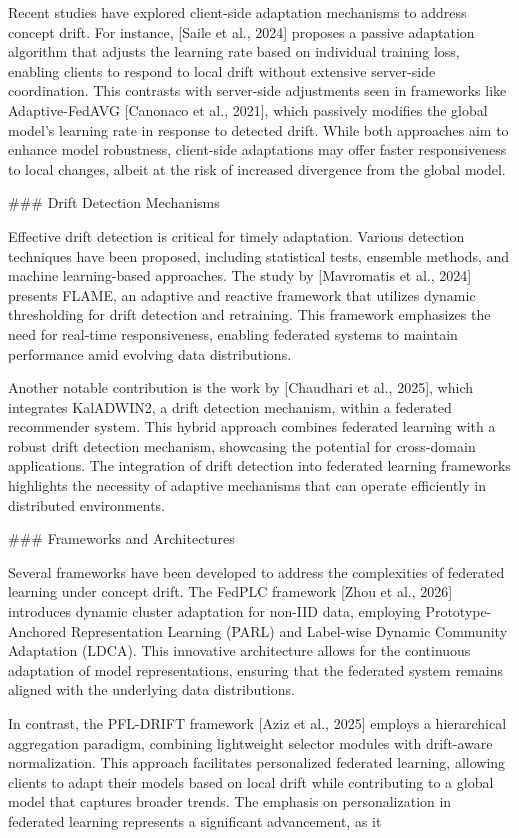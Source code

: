 \documentclass[journal]{IEEEtran}
\begin{document}
Recent studies have explored client-side adaptation mechanisms to address concept drift. For instance, [Saile et al., 2024] proposes a passive adaptation algorithm that adjusts the learning rate based on individual training loss, enabling clients to respond to local drift without extensive server-side coordination. This contrasts with server-side adjustments seen in frameworks like Adaptive-FedAVG [Canonaco et al., 2021], which passively modifies the global model's learning rate in response to detected drift. While both approaches aim to enhance model robustness, client-side adaptations may offer faster responsiveness to local changes, albeit at the risk of increased divergence from the global model.

\#\#\# Drift Detection Mechanisms

Effective drift detection is critical for timely adaptation. Various detection techniques have been proposed, including statistical tests, ensemble methods, and machine learning-based approaches. The study by [Mavromatis et al., 2024] presents FLAME, an adaptive and reactive framework that utilizes dynamic thresholding for drift detection and retraining. This framework emphasizes the need for real-time responsiveness, enabling federated systems to maintain performance amid evolving data distributions.

Another notable contribution is the work by [Chaudhari et al., 2025], which integrates KalADWIN2, a drift detection mechanism, within a federated recommender system. This hybrid approach combines federated learning with a robust drift detection mechanism, showcasing the potential for cross-domain applications. The integration of drift detection into federated learning frameworks highlights the necessity of adaptive mechanisms that can operate efficiently in distributed environments.

\#\#\# Frameworks and Architectures

Several frameworks have been developed to address the complexities of federated learning under concept drift. The FedPLC framework [Zhou et al., 2026] introduces dynamic cluster adaptation for non-IID data, employing Prototype-Anchored Representation Learning (PARL) and Label-wise Dynamic Community Adaptation (LDCA). This innovative architecture allows for the continuous adaptation of model representations, ensuring that the federated system remains aligned with the underlying data distributions.

In contrast, the PFL-DRIFT framework [Aziz et al., 2025] employs a hierarchical aggregation paradigm, combining lightweight selector modules with drift-aware normalization. This approach facilitates personalized federated learning, allowing clients to adapt their models based on local drift while contributing to a global model that captures broader trends. The emphasis on personalization in federated learning represents a significant advancement, as it
\end{document}
